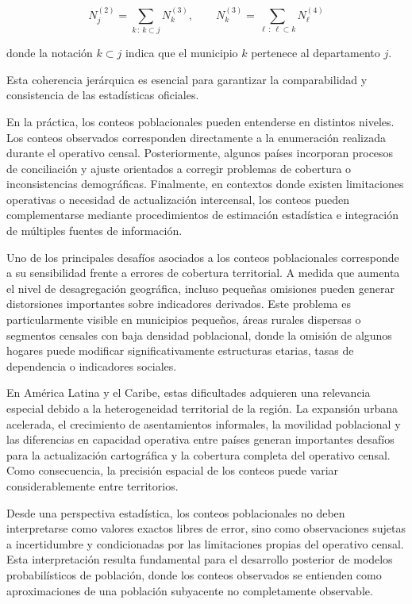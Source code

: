 \documentclass[
  spanish,
]{book}
\begin{document}
\[
N_j^{(2)} = \sum_{k \,:\, k \subset j} N_k^{(3)}, \qquad N_k^{(3)} = \sum_{\ell \,:\, \ell \subset k} N_\ell^{(4)}
\]

donde la notación \(k \subset j\) indica que el municipio \(k\) pertenece al departamento \(j\).

Esta coherencia jerárquica es esencial para garantizar la comparabilidad y consistencia de las estadísticas oficiales.

En la práctica, los conteos poblacionales pueden entenderse en distintos niveles. Los conteos observados corresponden directamente a la enumeración realizada durante el operativo censal. Posteriormente, algunos países incorporan procesos de conciliación y ajuste orientados a corregir problemas de cobertura o inconsistencias demográficas. Finalmente, en contextos donde existen limitaciones operativas o necesidad de actualización intercensal, los conteos pueden complementarse mediante procedimientos de estimación estadística e integración de múltiples fuentes de información.

Uno de los principales desafíos asociados a los conteos poblacionales corresponde a su sensibilidad frente a errores de cobertura territorial. A medida que aumenta el nivel de desagregación geográfica, incluso pequeñas omisiones pueden generar distorsiones importantes sobre indicadores derivados. Este problema es particularmente visible en municipios pequeños, áreas rurales dispersas o segmentos censales con baja densidad poblacional, donde la omisión de algunos hogares puede modificar significativamente estructuras etarias, tasas de dependencia o indicadores sociales.

En América Latina y el Caribe, estas dificultades adquieren una relevancia especial debido a la heterogeneidad territorial de la región. La expansión urbana acelerada, el crecimiento de asentamientos informales, la movilidad poblacional y las diferencias en capacidad operativa entre países generan importantes desafíos para la actualización cartográfica y la cobertura completa del operativo censal. Como consecuencia, la precisión espacial de los conteos puede variar considerablemente entre territorios.

Desde una perspectiva estadística, los conteos poblacionales no deben interpretarse como valores exactos libres de error, sino como observaciones sujetas a incertidumbre y condicionadas por las limitaciones propias del operativo censal. Esta interpretación resulta fundamental para el desarrollo posterior de modelos probabilísticos de población, donde los conteos observados se entienden como aproximaciones de una población subyacente no completamente observable.
\end{document}
